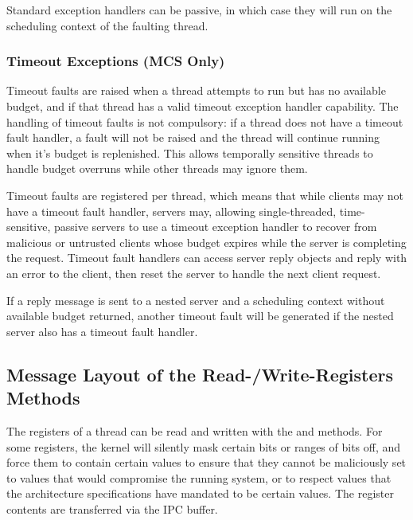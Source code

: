 Standard exception handlers can be passive, in which case they will run on the
scheduling context of the faulting thread.

\subsubsection{Timeout Exceptions (MCS Only)} \label{sec:timeout-exceptions}

Timeout faults are raised when a thread attempts to run but has no available
budget, and if that thread has a valid timeout exception handler capability.
The handling of timeout faults is not compulsory: if a thread does not have a
timeout fault handler, a fault will not be raised and the thread will continue
running when it's budget is replenished.  This allows temporally sensitive
threads to handle budget overruns while other threads may ignore them.

Timeout faults are registered per thread, which means that while clients may
not have a timeout fault handler, servers may, allowing single-threaded,
time-sensitive, passive servers to use a timeout exception handler to recover
from malicious or untrusted clients whose budget expires while the server is
completing the request.  Timeout fault handlers can access server reply objects
and reply with an error to the client, then reset the server to handle the next
client request.

If a reply message is sent to a nested server and a scheduling context without
available budget returned, another timeout fault will be generated if the
nested server also has a timeout fault handler.

\subsection{Message Layout of the Read-/Write-Registers Methods}
\label{sec:read_write_registers}

The registers of a thread can be read and written with the
 and  methods.
For some registers, the kernel will silently mask certain bits or ranges of bits off, and force them to contain certain
values to ensure that they cannot be maliciously set to values that would compromise the running system, or to respect
values that the architecture specifications have mandated to be certain values.
The register contents are transferred via the IPC buffer.

